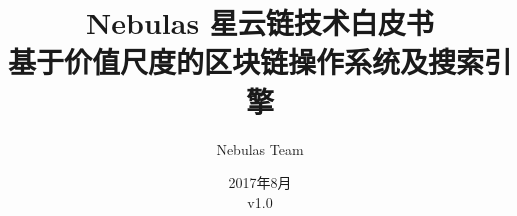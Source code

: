 \documentclass[11.5pt]{article}
\begin{document}
\renewcommand{\contentsname}{目录}
\renewcommand{\abstractname}{摘要}
\renewcommand{\refname}{参考文献}
\renewcommand{\nomname}{术语表（按首字母排序）}
\renewcommand{\figurename}{图}
\renewcommand{\tablename}{表}
\renewcommand{\baselinestretch}{1.5}
\renewcommand{\appendixname}{附录}

\title{
	Nebulas 星云链技术白皮书 \\
	\large 基于价值尺度的区块链操作系统及搜索引擎}
\author{Nebulas Team}
\date{2017年8月\\v1.0}

\maketitle

\newpage

\tableofcontents

\printnomenclature


\newpage

\newpage

\newpage

\newpage

\newpage

\newpage

\newpage

\newpage

\newpage

\printbibliography

\begin{appendices}



\end{appendices}

%
\end{document}
